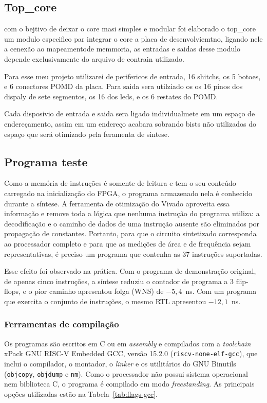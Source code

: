 \subsection{Top_core}
\label{sub:core}

com o bejtivo de deixar o core masi simples e modular foi elaborado o top_core um modulo especifico par integrar o core a placa de desenvolviemtno, ligando nele a cenexão ao mapeamentode memmoria, as entradas e saidas desse modulo depende exclusivamente do arquivo de contrain utilizado.

Para esse meu projeto utilizarei de perifericos de entrada, 16 shitchs, os 5 botoes, e 6 conectores POMD da placa. Para saida sera utilziado os os 16 pinos dos dispaly de sete segmentos, os 16 dos leds, e os 6 restates do POMD. 

Cada disposivio de entrada e saida sera ligado individualmete em um espaço de endereçamento, assim em um endereço acabara sobrando bists não utilizados do espaço que será otimizado pela feramenta de sintese. 

\subsection{Programa teste}
\label{sub:progrmaTeste}

Como a memória de instruções é somente de leitura e tem o seu conteúdo
carregado na inicialização do FPGA, o programa armazenado nela é conhecido
durante a síntese. A ferramenta de otimização do Vivado aproveita essa
informação e remove toda a lógica que nenhuma instrução do programa utiliza:
a decodificação e o caminho de dados de uma instrução ausente são eliminados
por propagação de constantes. Portanto, para que o circuito sintetizado
corresponda ao processador completo e para que as medições de área e de
frequência sejam representativas, é preciso um programa que contenha as 37
instruções suportadas.

Esse efeito foi observado na prática. Com o programa de demonstração
original, de apenas cinco instruções, a síntese reduziu o contador de
programa a 3 flip-flops, e o pior caminho apresentou folga (WNS) de
$-5{,}4$~ns. Com um programa que exercita o conjunto de instruções, o mesmo
RTL apresentou $-12{,}1$~ns.

\subsubsection{Ferramentas de compilação}

Os programas são escritos em C ou em \textit{assembly} e compilados com a
\textit{toolchain} xPack GNU RISC-V Embedded GCC, versão 15.2.0
(\texttt{riscv-none-elf-gcc}), que inclui o compilador, o montador, o
\textit{linker} e os utilitários do GNU Binutils (\texttt{objcopy},
\texttt{objdump} e \texttt{nm}). Como o processador não possui sistema
operacional nem biblioteca C, o programa é compilado em modo
\textit{freestanding}. As principais opções utilizadas estão na
Tabela~\ref{tab:flags-gcc}.

